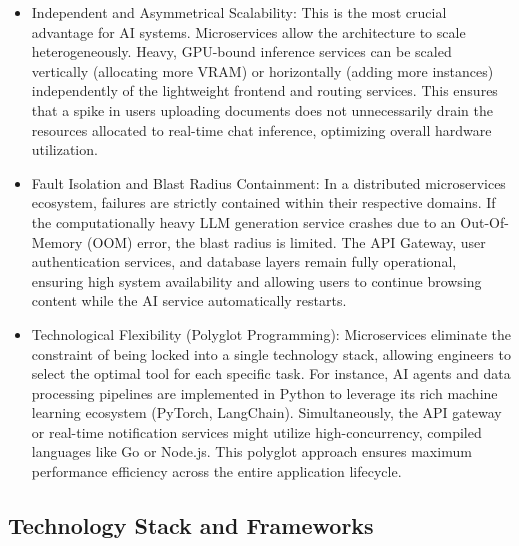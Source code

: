 \begin{itemize}
    \item {Independent and Asymmetrical Scalability:} This is the most crucial advantage for AI systems. Microservices allow the architecture to scale heterogeneously. Heavy, GPU-bound inference services can be scaled vertically (allocating more VRAM) or horizontally (adding more instances) independently of the lightweight frontend and routing services. This ensures that a spike in users uploading documents does not unnecessarily drain the resources allocated to real-time chat inference, optimizing overall hardware utilization.
    
    \item {Fault Isolation and Blast Radius Containment:} In a distributed microservices ecosystem, failures are strictly contained within their respective domains. If the computationally heavy LLM generation service crashes due to an Out-Of-Memory (OOM) error, the blast radius is limited. The API Gateway, user authentication services, and database layers remain fully operational, ensuring high system availability and allowing users to continue browsing content while the AI service automatically restarts.
    
    \item {Technological Flexibility (Polyglot Programming):} Microservices eliminate the constraint of being locked into a single technology stack, allowing engineers to select the optimal tool for each specific task. For instance, AI agents and data processing pipelines are implemented in Python to leverage its rich machine learning ecosystem (PyTorch, LangChain). Simultaneously, the API gateway or real-time notification services might utilize high-concurrency, compiled languages like Go or Node.js. This polyglot approach ensures maximum performance efficiency across the entire application lifecycle.
\end{itemize}

\subsection{Technology Stack and Frameworks}


